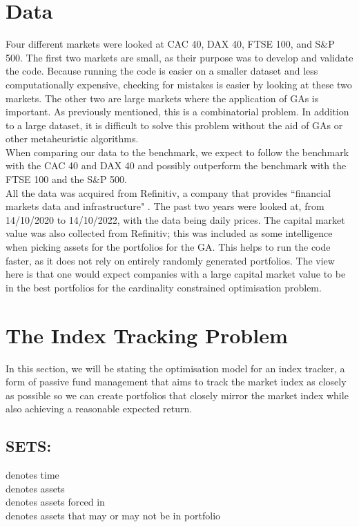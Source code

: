 \documentclass[12pt]{report}
\begin{document}
\section{Data} \label{data}
Four different markets were looked at CAC 40, DAX 40, FTSE 100, and S\&P 500. The first two markets are small, as their purpose was to develop and validate the code. Because running the code is easier on a smaller dataset and less computationally expensive, checking for mistakes is easier by looking at these two markets. The other two are large markets where the application of GAs is important. As previously mentioned, this is a combinatorial problem. In addition to a large dataset, it is difficult to solve this problem without the aid of GAs or other metaheuristic algorithms.\\ \newline
\noindent
When comparing our data to the benchmark, we expect to follow the benchmark with the CAC 40 and DAX 40 and possibly outperform the benchmark with the FTSE 100 and the S\&P 500.\\ \newline
\noindent
All the data was acquired from Refinitiv, a company that provides ``financial markets data and infrastructure" \cite{refinitiv}. The past two years were looked at, from 14/10/2020 to 14/10/2022, with the data being daily prices. The capital market value was also collected from Refinitiv; this was included as some intelligence when picking assets for the portfolios for the GA. This helps to run the code faster, as it does not rely on entirely randomly generated portfolios. The view here is that one would expect companies with a large capital market value to be in the best portfolios for the cardinality constrained optimisation problem.

\section{The Index Tracking Problem} \label{indexmodel}
In this section, we will be stating the optimisation model for an index tracker, a form of passive fund management that aims to track the market index as closely as possible so we can create portfolios that closely mirror the market index while also achieving a reasonable expected return.
\subsection*{SETS:}
\noindent {}  denotes time\\ 
\noindent {}  denotes assets\\
\noindent {}  denotes assets forced in\\
\noindent {}  denotes assets that may or may not be in portfolio \\
\end{document}
